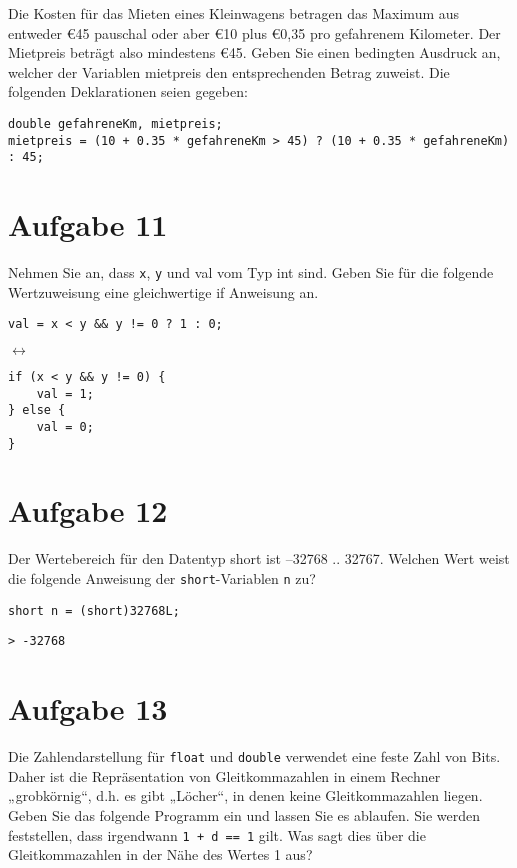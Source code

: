 \documentclass[10pt, oneside]{article}
\begin{document}
Die Kosten für das Mieten eines Kleinwagens betragen das Maximum aus entweder
\euro45 pauschal oder aber \euro10 plus \euro0,35 pro
gefahrenem Kilometer. Der Mietpreis beträgt also mindestens \euro45.
Geben Sie einen bedingten Ausdruck an, welcher der Variablen mietpreis den
entsprechenden Betrag zuweist. Die folgenden Deklarationen seien gegeben:

\begin{verbatim}
double gefahreneKm, mietpreis;
mietpreis = (10 + 0.35 * gefahreneKm > 45) ? (10 + 0.35 * gefahreneKm) : 45;
\end{verbatim}

\section{Aufgabe 11}

Nehmen Sie an, dass \verb+x+, \verb+y+ und val vom Typ int sind. Geben Sie für
die folgende Wertzuweisung eine gleichwertige if Anweisung an.

\begin{verbatim}
val = x < y && y != 0 ? 1 : 0;
\end{verbatim}

$\leftrightarrow$

\begin{verbatim}
if (x < y && y != 0) {
    val = 1;
} else {
    val = 0;
}
\end{verbatim}

\section{Aufgabe 12}

Der Wertebereich für den Datentyp short ist –32768 .. 32767. Welchen Wert weist
die folgende Anweisung der \verb+short+-Variablen \verb+n+ zu?

\begin{verbatim}
short n = (short)32768L;
\end{verbatim}

\begin{verbatim}
> -32768
\end{verbatim}

\section{Aufgabe 13}

Die Zahlendarstellung für \verb+float+ und \verb+double+ verwendet eine feste
Zahl von Bits. Daher ist die Repräsentation von Gleitkommazahlen in einem
Rechner „grobkörnig“, d.h. es gibt „Löcher“, in denen keine Gleitkommazahlen
liegen. Geben Sie das folgende Programm ein und lassen Sie es ablaufen. Sie
werden feststellen, dass irgendwann \verb|1 + d == 1| gilt. Was sagt dies über
die Gleitkommazahlen in der Nähe des Wertes 1 aus?
\end{document}
